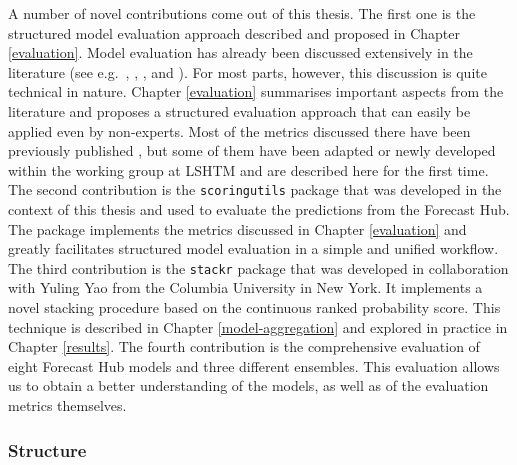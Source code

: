\documentclass[
]{book}
\begin{document}
A number of novel contributions come out of this thesis. The first one is the structured model evaluation approach described and proposed in Chapter \ref{evaluation}. Model evaluation has already been discussed extensively in the literature (see e.g.~\citet{gneitingStrictlyProperScoring2007}, \citet{gneitingMakingEvaluatingPoint2010}, \citet{bracherEvaluatingEpidemicForecasts2020}, and \citet{funkAssessingPerformanceRealtime2019}). For most parts, however, this discussion is quite technical in nature. Chapter \ref{evaluation} summarises important aspects from the literature and proposes a structured evaluation approach that can easily be applied even by non-experts. Most of the metrics discussed there have been previously published \citep{bracherEvaluatingEpidemicForecasts2020, funkAssessingPerformanceRealtime2019, gneitingStrictlyProperScoring2007}, but some of them have been adapted or newly developed within the working group at LSHTM and are described here for the first time. The second contribution is the \texttt{scoringutils} package \citep{R-scoringutils} that was developed in the context of this thesis and used to evaluate the predictions from the Forecast Hub. The package implements the metrics discussed in Chapter \ref{evaluation} and greatly facilitates structured model evaluation in a simple and unified workflow. The third contribution is the \texttt{stackr} package \citep{R-stackr} that was developed in collaboration with Yuling Yao from the Columbia University in New York. It implements a novel stacking procedure based on the continuous ranked probability score. This technique is described in Chapter \ref{model-aggregation} and explored in practice in Chapter \ref{results}. The fourth contribution is the comprehensive evaluation of eight Forecast Hub models and three different ensembles. This evaluation allows us to obtain a better understanding of the models, as well as of the evaluation metrics themselves.

\hypertarget{structure}{%
\subsubsection*{Structure}\label{structure}}
\end{document}
